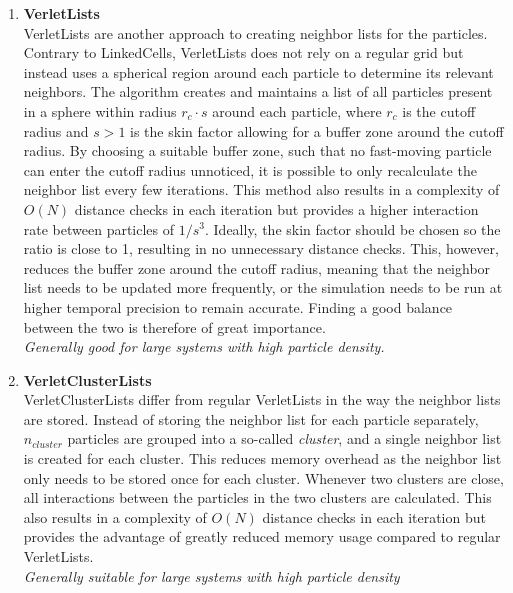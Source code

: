 \begin{enumerate}[label=\textbf{\arabic*.}]
\begin{enumerate}
                  \item \textbf{VerletLists} \\
                        VerletLists are another approach to creating neighbor lists for the particles. Contrary to LinkedCells, VerletLists does not rely on a regular grid but instead uses a spherical region around each particle to determine its relevant neighbors. The algorithm creates and maintains a list of all particles present in a sphere within radius $r_c \cdot s$ around each particle, where $r_c$ is the cutoff radius and $s>1$ is the skin factor allowing for a buffer zone around the cutoff radius.
                        By choosing a suitable buffer zone, such that no fast-moving particle can enter the cutoff radius unnoticed, it is possible to only recalculate the neighbor list every few iterations. This method also results in a complexity of $O(N)$ distance checks in each iteration but provides a higher interaction rate between particles of $1/s^3$. Ideally, the skin factor should be chosen so the ratio is close to 1, resulting in no unnecessary distance checks. This, however, reduces the buffer zone around the cutoff radius, meaning that the neighbor list needs to be updated more frequently, or the simulation needs to be run at higher temporal precision to remain accurate. Finding a good balance between the two is therefore of great importance.\\
                        \textit{Generally good for large systems with high particle density.}

                  \item \textbf{VerletClusterLists} \\
                        VerletClusterLists differ from regular VerletLists in the way the neighbor lists are stored. Instead of storing the neighbor list for each particle separately, $n_{cluster}$ particles are grouped into a so-called \emph{cluster}, and a single neighbor list is created for each cluster. This reduces memory overhead as the neighbor list only needs to be stored once for each cluster. Whenever two clusters are close, all interactions between the particles in the two clusters are calculated. This also results in a complexity of $O(N)$ distance checks in each iteration but provides the advantage of greatly reduced memory usage compared to regular VerletLists.\\
                        \textit{Generally suitable for large systems with high particle density}

            \end{enumerate}


\end{enumerate}
